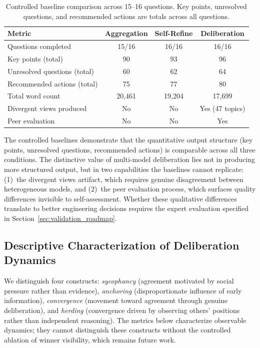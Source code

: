 \documentclass[11pt,a4paper]{article}
\begin{document}
\begin{table}[ht]
\centering
\caption{Controlled baseline comparison across 15--16 questions. Key points, unresolved questions, and recommended actions are totals across all questions.}
\label{tab:baselines}
\begin{tabular}{@{}lccc@{}}
\toprule
\textbf{Metric} & \textbf{Aggregation} & \textbf{Self-Refine} & \textbf{Deliberation} \\
\midrule
Questions completed & 15/16 & 16/16 & 16/16 \\
Key points (total) & 90 & 93 & 96 \\
Unresolved questions (total) & 60 & 62 & 64 \\
Recommended actions (total) & 75 & 77 & 80 \\
Total word count & 20{,}461 & 19{,}204 & 17{,}699 \\
Divergent views produced & No & No & Yes (47 topics) \\
Peer evaluation & No & No & Yes \\
\bottomrule
\end{tabular}
\end{table}

The controlled baselines demonstrate that the quantitative output structure (key points, unresolved questions, recommended actions) is comparable across all three conditions. The distinctive value of multi-model deliberation lies not in producing more structured output, but in two capabilities the baselines cannot replicate: (1)~the divergent views artifact, which requires genuine disagreement between heterogeneous models, and (2)~the peer evaluation process, which surfaces quality differences invisible to self-assessment. Whether these qualitative differences translate to better engineering decisions requires the expert evaluation specified in Section~\ref{sec:validation_roadmap}.

\subsection{Descriptive Characterization of Deliberation Dynamics}
\label{sec:similarity}

We distinguish four constructs: \textit{sycophancy} (agreement motivated by social pressure rather than evidence), \textit{anchoring} (disproportionate influence of early information), \textit{convergence} (movement toward agreement through genuine deliberation), and \textit{herding} (convergence driven by observing others' positions rather than independent reasoning). The metrics below characterize observable dynamics; they cannot distinguish these constructs without the controlled ablation of winner visibility, which remains future work.
\end{document}
